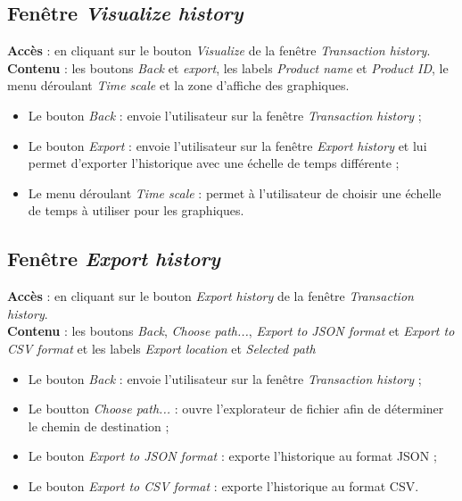 \documentclass{article}
\newcommand{\navbutton}[2]{Le bouton \emph{#1} : envoie l'utilisateur sur la fenêtre \emph{#2}}
\newcommand{\access}[1]{ \noindent\textbf{Accès} : #1 \\}
\newcommand{\content}[1]{\textbf{Contenu} : #1}
\begin{document}
\subsection{Fenêtre \emph{Visualize history}}
\access{en cliquant sur le bouton \emph{Visualize} de la fenêtre \emph{Transaction history}.}
\content{les boutons \emph{Back} et \emph{export}, les labels \emph{Product name} et \emph{Product ID}, le menu déroulant \emph{Time scale} et la zone d'affiche des graphiques.}
\begin{itemize}
\item \navbutton{Back}{Transaction history} ;
\item \navbutton{Export}{Export history} et lui permet d'exporter l'historique avec une échelle de temps différente ;
\item Le menu déroulant \emph{Time scale} : permet à l'utilisateur de choisir une échelle de temps à utiliser pour les graphiques.
\end{itemize}


\subsection{Fenêtre \emph{Export history}}
\access{en cliquant sur le bouton \emph{Export history} de la fenêtre \emph{Transaction history}.}
\content{les boutons \emph{Back}, \emph{Choose path...}, \emph{Export to JSON format} et \emph{Export to CSV format} et les labels \emph{Export location} et \emph{Selected path}}
\begin{itemize}
\item \navbutton{Back}{Transaction history} ;
\item Le boutton \emph{Choose path...} : ouvre l'explorateur de fichier afin de déterminer le chemin de destination ;
\item Le bouton \emph{Export to JSON format} : exporte l'historique au format JSON ;
\item Le bouton \emph{Export to CSV format} : exporte l'historique au format CSV.
\end{itemize}
\end{document}
